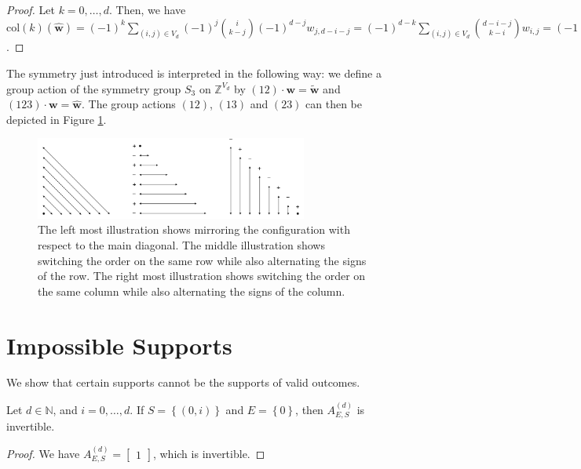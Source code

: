 \begin{proof}
    Let \( k = 0, \dots, d \). Then, we have \( \mathrm{col}(k)(\hat{\mathbf w}) = (-1)^k \sum_{(i,j) \in V_d}(-1)^j \binom{i}{k-j}(-1)^{d-j}w_{j, d-i-j} 
    = (-1)^{d-k} \sum_{(i,j) \in V_d}\binom{d-i-j}{k-i}w_{i, j} 
    = (-1)^{d-k} \mathrm{diag}(k)(\mathbf w) = 0 \).
\end{proof}

The symmetry just introduced is interpreted in the following way: we define a group action of the symmetry group \( S_3 \) on \( \mathbb{Z}^{V_d} \) by \( (12) \cdot \mathbf w = \tilde{\mathbf w}  \) and \( (123) \cdot \mathbf w = \hat{\mathbf w} \).
The group actions \( (12) \), \( (13) \) and \( (23) \) can then be depicted in Figure \ref{fig:group-action-s3}.

\begin{figure}[H]
    \centering
    \includegraphics[width=0.8\textwidth]{assets/group-action-s3.png}
    \caption{The left most illustration shows mirroring the configuration with respect to the main diagonal. The middle illustration shows switching the order on the same row while also alternating the signs of the row. The right most illustration shows switching the order on the same column while also alternating the signs of the column.}
    \label{fig:group-action-s3}
\end{figure}

\section{Impossible Supports}\label{sec:impossible-supports}

We show that certain supports cannot be the supports of valid outcomes. 

\begin{proposition}\label{prop:impossible-support-23233243243423}
    Let \( d \in \mathbb{N} \), and \( i=0, \dots, d \). If \( S = \left\{ (0,i) \right\} \) and \( E = \left\{ 0 \right\} \), then \( A^{(d)}_{E,S} \) is invertible.
\end{proposition}

\begin{proof}
    We have \( A^{(d)}_{E,S} = \begin{bmatrix}
        1
    \end{bmatrix} \), which is invertible.
\end{proof}

